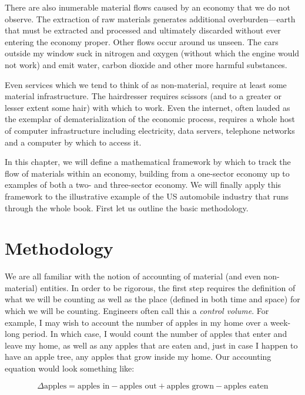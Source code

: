 There are also inumerable material flows caused by an economy that we do not observe.
The extraction of raw materials generates additional overburden---earth that must be
extracted and processed and ultimately discarded without ever entering the economy
proper. Other flows occur around us unseen. The cars outside my window suck in nitrogen
and oxygen (without which the engine would not work) and emit water, carbon dioxide and
other more harmful substances. 

Even services which we tend to think of as non-material, require at least some material
infrastructure. The hairdresser requires scissors (and to a greater or lesser extent 
some hair) with which to work. Even the internet, often lauded as the exemplar of
dematerialization of the economic process, requires a whole host of computer
infrastructure including electricity, data servers, telephone networks and a
computer by which to access it.

In this chapter, we will define a mathematical framework by which to track the flow of
materials within an economy, building from a one-sector economy up to examples of both a
two- and three-sector economy. We will finally apply this framework to the illustrative
example of the US automobile industry that runs through the whole book. First let us
outline the basic methodology.

\section{Methodology}

We are all familiar with the notion of accounting of material (and even non-material)
entities. In order to be rigorous, the first step requires the definition of what we
will be counting as well as the place (defined in both time and space) for which we will
be counting. Engineers often call this a \emph{control volume}. For example, I may wish
to account the number of apples in my home over a week-long period. In which case,
I would count the number of apples that enter  and leave my home, as well as any apples
that are eaten and, just in case I happen to have an apple tree, any apples that grow
inside my home. Our accounting equation would look something like:

\begin{equation}
	\Delta\textrm{apples} = \textrm{apples in} - \textrm{apples out} + \textrm{apples grown} - \textrm{apples eaten}
\end{equation}


